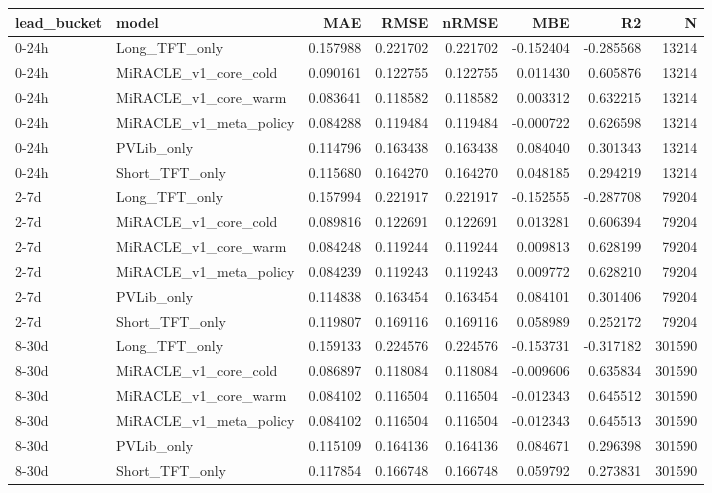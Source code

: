 \begin{tabular}{llrrrrrr}
\toprule
lead_bucket & model & MAE & RMSE & nRMSE & MBE & R2 & N \\
\midrule
0-24h & Long_TFT_only & 0.157988 & 0.221702 & 0.221702 & -0.152404 & -0.285568 & 13214 \\
0-24h & MiRACLE_v1_core_cold & 0.090161 & 0.122755 & 0.122755 & 0.011430 & 0.605876 & 13214 \\
0-24h & MiRACLE_v1_core_warm & 0.083641 & 0.118582 & 0.118582 & 0.003312 & 0.632215 & 13214 \\
0-24h & MiRACLE_v1_meta_policy & 0.084288 & 0.119484 & 0.119484 & -0.000722 & 0.626598 & 13214 \\
0-24h & PVLib_only & 0.114796 & 0.163438 & 0.163438 & 0.084040 & 0.301343 & 13214 \\
0-24h & Short_TFT_only & 0.115680 & 0.164270 & 0.164270 & 0.048185 & 0.294219 & 13214 \\
2-7d & Long_TFT_only & 0.157994 & 0.221917 & 0.221917 & -0.152555 & -0.287708 & 79204 \\
2-7d & MiRACLE_v1_core_cold & 0.089816 & 0.122691 & 0.122691 & 0.013281 & 0.606394 & 79204 \\
2-7d & MiRACLE_v1_core_warm & 0.084248 & 0.119244 & 0.119244 & 0.009813 & 0.628199 & 79204 \\
2-7d & MiRACLE_v1_meta_policy & 0.084239 & 0.119243 & 0.119243 & 0.009772 & 0.628210 & 79204 \\
2-7d & PVLib_only & 0.114838 & 0.163454 & 0.163454 & 0.084101 & 0.301406 & 79204 \\
2-7d & Short_TFT_only & 0.119807 & 0.169116 & 0.169116 & 0.058989 & 0.252172 & 79204 \\
8-30d & Long_TFT_only & 0.159133 & 0.224576 & 0.224576 & -0.153731 & -0.317182 & 301590 \\
8-30d & MiRACLE_v1_core_cold & 0.086897 & 0.118084 & 0.118084 & -0.009606 & 0.635834 & 301590 \\
8-30d & MiRACLE_v1_core_warm & 0.084102 & 0.116504 & 0.116504 & -0.012343 & 0.645512 & 301590 \\
8-30d & MiRACLE_v1_meta_policy & 0.084102 & 0.116504 & 0.116504 & -0.012343 & 0.645513 & 301590 \\
8-30d & PVLib_only & 0.115109 & 0.164136 & 0.164136 & 0.084671 & 0.296398 & 301590 \\
8-30d & Short_TFT_only & 0.117854 & 0.166748 & 0.166748 & 0.059792 & 0.273831 & 301590 \\
\bottomrule
\end{tabular}
